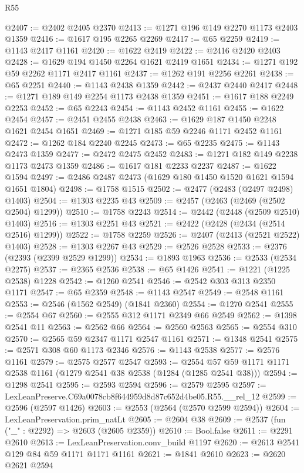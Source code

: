 \begin{lexlean}{R55}
\begin{coremodule}
@2407 := @2402 @2405 @2370
@2413 := @1271 @196 @149 @2270 @1173 @2403 @1359
@2416 := @1617 @195 @2265 @2269
@2417 := @65 @2259
@2419 := @1143 @2417 @1161
@2420 := @1622 @2419
@2422 := @2416 @2420 @2403
@2428 := @1629 @194 @1450 @2264 @1621 @2419 @1651
@2434 := @1271 @192 @59 @2262 @1171 @2417 @1161
@2437 := @1262 @191 @2256 @2261
@2438 := @65 @2251
@2440 := @1143 @2438 @1359
@2442 := @2437 @2440 @2417
@2448 := @1271 @189 @149 @2254 @1173 @2438 @1359
@2451 := @1617 @188 @2249 @2253
@2452 := @65 @2243
@2454 := @1143 @2452 @1161
@2455 := @1622 @2454
@2457 := @2451 @2455 @2438
@2463 := @1629 @187 @1450 @2248 @1621 @2454 @1651
@2469 := @1271 @185 @59 @2246 @1171 @2452 @1161
@2472 := @1262 @184 @2240 @2245
@2473 := @65 @2235
@2475 := @1143 @2473 @1359
@2477 := @2472 @2475 @2452
@2483 := @1271 @182 @149 @2238 @1173 @2473 @1359
@2486 := @1617 @181 @2233 @2237
@2487 := @1622 @1594
@2497 := @2486 @2487 @2473 (@1629 @180 @1450 @1520 @1621 @1594 @1651 @1804)
@2498 := @1758 @1515
@2502 := @2477 (@2483 (@2497 @2498) @1403)
@2504 := @1303 @2235 @43
@2509 := @2457 (@2463 (@2469 (@2502 @2504) @1299))
@2510 := @1758 @2243
@2514 := @2442 (@2448 (@2509 @2510) @1403)
@2516 := @1303 @2251 @43
@2521 := @2422 (@2428 (@2434 (@2514 @2516) @1299))
@2522 := @1758 @2259
@2526 := @2407 (@2413 (@2521 @2522) @1403)
@2528 := @1303 @2267 @43
@2529 := @2526 @2528
@2533 := @2376 (@2393 (@2399 @2529 @1299))
@2534 := @1893 @1963
@2536 := @2533 (@2534 @2275)
@2537 := @2365 @2536
@2538 := @65 @1426
@2541 := @1221 (@1225 @2538) @1228
@2542 := @1260 @2541
@2546 := @2542 @303 @313 @2350 @1171
@2547 := @65 @2359
@2548 := @1143 @2547
@2549 := @2548 @1161
@2553 := @2546 (@1562 @2549) (@1841 @2360)
@2554 := @1270 @2541
@2555 := @2554 @67
@2560 := @2555 @312 @1171 @2349 @66 @2549
@2562 := @1398 @2541 @11
@2563 := @2562 @66
@2564 := @2560 @2563
@2565 := @2554 @310
@2570 := @2565 @59 @2347 @1171 @2547 @1161
@2571 := @1348 @2541
@2575 := @2571 @308 @60 @1173 @2346
@2576 := @1143 @2538
@2577 := @2576 @1161
@2579 := @2575 @2577 @2547
@2593 := @2554 @57 @59 @1171 @1171 @2538 @1161 (@1279 @2541 @38 @2538 (@1284 (@1285 @2541 @38)))
@2594 := @1298 @2541
@2595 := @2593 @2594
@2596 := @2579 @2595
@2597 := LexLeanPreserve.C69a0078cb8f644959d8d87c652d4be05.R55.__rel_12
@2599 := @2596 (@2597 @1426)
@2603 := @2553 (@2564 (@2570 @2599 @2594))
@2604 := LexLeanPreservation.prim_natLt
@2605 := @2604 @38
@2609 := @2537 (fun ("_" : @2292) => @2603 (@2605 @2359))
@2610 := Bool.false
@2611 := @2291 @2610
@2613 := LexLeanPreservation.conv_build @1197
@2620 := @2613 @2541 @129 @84 @59 @1171 @1171 @1161
@2621 := @1841 @2610
@2623 := @2620 @2621 @2594

\end{coremodule}
\end{lexlean}
